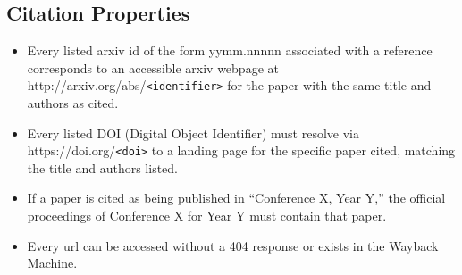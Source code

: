 \documentclass{article}
\theoremstyle{plain}
\theoremstyle{definition}
\theoremstyle{remark}
\begin{document}
\subsection{Citation Properties}
\begin{itemize}
  \item Every listed arxiv id of the form yymm.nnnnn associated with a reference corresponds to an accessible arxiv webpage at http://arxiv.org/abs/\texttt{<identifier>} for the paper with the same title and authors as cited.
  \item Every listed DOI (Digital Object Identifier) must resolve via https://doi.org/\texttt{<doi>} to a landing page for the specific paper cited, matching the title and authors listed.
  \item If a paper is cited as being published in ``Conference X, Year Y,'' the official proceedings of Conference X for Year Y must contain that paper.
  \item Every url can be accessed without a 404 response or exists in the Wayback Machine.
\end{itemize}
\end{document}
